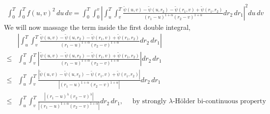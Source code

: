\documentclass[a4paper,12pt]{article}
\theoremstyle{definition}
\begin{document}
\begin{enumerate}
\begin{enumerate}[(a)]
\begin{align*}
\int_{0}^{T}\int_{0}^{T}f(u,v)^2\,du\,dv = \int_{0}^{T} \int_{0}^{v}\left|\int_{u}^{T}\int_{v}^{T}\frac{\tilde{\psi}(u,v)-\tilde{\psi}(u,r_2)-\tilde{\psi}(r_1,v)+\tilde{\psi}(r_1,r_2)}{(r_1-u)^{1+\alpha}(r_2-v)^{1+\alpha}}dr_2\,dr_1\right|^2du\,dv
\end{align*}
We will now massage the term inside the first double integral,
\begin{align*}
&\left|\int_{u}^{T}\int_{v}^{T}\frac{\tilde{\psi}(u,v)-\tilde{\psi}(u,r_2)-\tilde{\psi}(r_1,v)+\tilde{\psi}(r_1,r_2)}{(r_1-u)^{1+\alpha}(r_2-v)^{1+\alpha}}dr_2\,dr_1\right| \\
\leq &\int_{u}^{T}\int_{v}^{T}\left|\frac{\tilde{\psi}(u,v)-\tilde{\psi}(u,r_2)-\tilde{\psi}(r_1,v)+\tilde{\psi}(r_1,r_2)}{(r_1-u)^{1+\alpha}(r_2-v)^{1+\alpha}}\right|dr_2\,dr_1\\
\leq &\int_{u}^{T}\int_{v}^{T}\frac{\left|\tilde{\psi}(u,v)-\tilde{\psi}(u,r_2)-\tilde{\psi}(r_1,v)+\tilde{\psi}(r_1,r_2)\right|}{\left|(r_1-u)^{1+\alpha}(r_2-v)^{1+\alpha}\right|}dr_2\,dr_1\\
\leq &\int_{u}^{T}\int_{v}^{T}\frac{\left|(r_1-u)^\lambda(r_2-v)^\lambda\right|}{\left|(r_1-u)^{1+\alpha}(r_2-v)^{1+\alpha}\right|}dr_2\,dr_1, \quad \text{ by strongly $\lambda$-H\"{o}lder bi-continuous property}
\end{align*}
\end{enumerate}


\end{enumerate}
\end{document}
